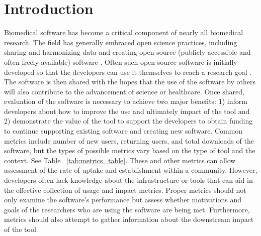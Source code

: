 \documentclass{article}
\begin{document}


\section{Introduction} Biomedical software has become a critical component of nearly all biomedical research.  The field has generally embraced open science practices, including sharing and harmonizing data and creating open source (publicly accessible and often freely available) software \cite{green_strategic_2020, levet_developing_2021, itcr_open-source_2021, merow_better_2023}. Often such open source software is initially developed so that the developers can use it themselves to reach a research goal \cite{bitzer_intrinsic_2007}. The software is then shared with the hopes that the use of the software by others will also contribute to the advancement of science or healthcare. Once shared, evaluation of the software is necessary to achieve two major benefits: 1) inform developers about how to improve the use and ultimately impact of the tool and 2) demonstrate the value of the tool to support the developers to obtain funding to continue supporting existing software and creating new software. Common metrics include number of new users, returning users, and total downloads of the software, but the types of possible metrics vary based on the type of tool and the context. See Table ~\ref{tab:metrics_table}. These and other metrics can allow assessment of the rate of uptake and establishment within a community. However, developers often lack knowledge about the infrastructure or tools that can aid in the effective collection of usage and impact metrics. Proper metrics should not only examine the software's performance but assess whether motivations and goals of the researchers who are using the software are being met. Furthermore, metrics should also attempt to gather information about the downstream impact of the tool. 
\end{document}

